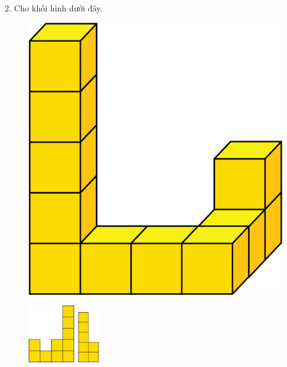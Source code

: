 	$2.$ Cho khối hình dưới đây.
	\begin{multicols}{2}
		\begin{thBox}
			\begin{figure}[H]
				\centering
				\vspace*{-10pt}
				\captionsetup{labelformat= empty, justification=centering}
				\includegraphics[scale=0.25]{6}
				\vspace*{5pt}
			\end{figure}
		\end{thBox}
	\begin{figure}[H]
		\centering
		\captionsetup{labelformat= empty, justification=centering}
		\includegraphics[width=0.18\textwidth]{7a}\,
		\includegraphics[width=0.08\textwidth]{7b}\,

\end{figure}
\end{multicols}
